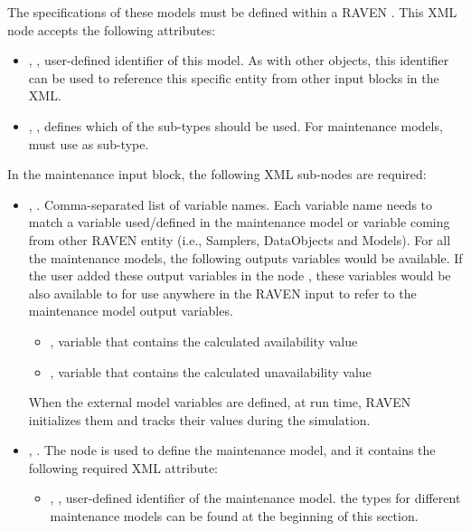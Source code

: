 The specifications of these models must be defined within a RAVEN . This
XML node accepts the following attributes:
\begin{itemize}
	\item {}, , user-defined identifier of this model.
	\nb As with other objects, this identifier can be used to reference this specific entity from other
	input blocks in the XML.
	\item {}, , defines which of the sub-types should
	be used. For maintenance models, must use  as sub-type.
\end{itemize}
In the maintenance  input block, the following XML sub-nodes are required:
\begin{itemize}
	\item {}, . Comma-separated list of variable
	names. Each variable name needs to match a variable used/defined in the maintenance model or variable
	coming from other RAVEN entity (i.e., Samplers, DataObjects and Models).
	\nb For all the maintenance models, the following outputs variables would be available. If the user
	added these output variables in the node , these variables would be also available to
	for use anywhere in the RAVEN input to refer to the maintenance model output variables.
	\begin{itemize}
		\item {}, variable that contains the calculated availability value
		\item {}, variable that contains the calculated unavailability value
	\end{itemize}
	\nb When the external model variables are defined, at run time, RAVEN initializes
	them and tracks their values during the simulation.
	\item {}, . The node is used to define the maintenance
	model, and it contains the following required XML attribute:
	\begin{itemize}
		\item {}, , user-defined identifier of the maintenance model.
		\nb the types for different maintenance models can be found at the beginning of this section.
	\end{itemize}
\end{itemize}
